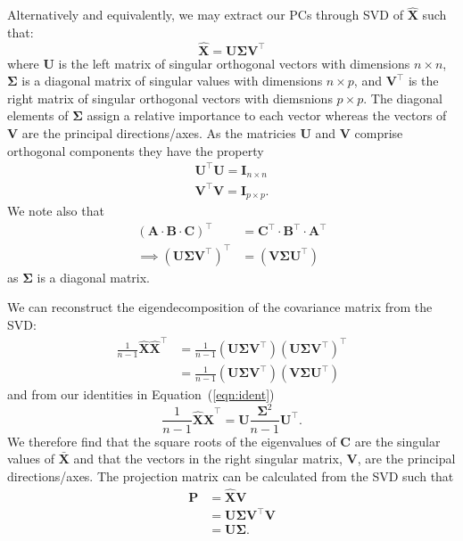 Alternatively and equivalently, we may extract our PCs through SVD of  $\mathbf{\hat{X}}$ such that: 
\begin{equation}
    \mathbf{\hat{X}} = \mathbf{U}  \mathbf{\Sigma} \mathbf{ V^\top}
\end{equation}
where \textbf{U} is the left matrix of singular orthogonal vectors with dimensions ${n \times n}$,
$\mathbf{\Sigma}$ is a diagonal matrix of singular values with dimensions $n \times p$, 
and $\mathbf{V^{\top}}$ is the right matrix of singular  orthogonal vectors with diemsnions ${p \times p}$. 
The diagonal elements of $\mathbf{\Sigma}$ assign a  relative  importance  to  each  vector whereas the vectors of \textbf{V} are the principal directions/axes.
As the matricies \textbf{U} and \textbf{V} comprise orthogonal components they have the property
\begin{eqnarray}
\label{eqn:ident}
\mathbf{U^{\top}U}=\mathbf I_{n \times n} \\ \nonumber
\mathbf{V^{\top}V}=\mathbf I_{p \times p}.
\end{eqnarray}
We note also that 
\begin{align}
    \left(\mathbf {A \cdot B \cdot C }\right)^\top &= \mathbf{C^\top \cdot B^\top \cdot A^\top} \\
    \implies  (\mathbf U\mathbf \Sigma\mathbf V^\top)^\top &= (\mathbf V\mathbf \Sigma\mathbf U^\top)
\end{align}
as $\mathbf{\Sigma}$ is a diagonal matrix.


We can reconstruct the eigendecomposition of the covariance matrix from the SVD: 
\begin{eqnarray}
 \frac{1}{n-1}\mathbf{\hat{X}}\mathbf{\hat{X}}^\top &= \frac{1}{n-1} (\mathbf U\mathbf \Sigma\mathbf V^\top)(\mathbf U\mathbf \Sigma\mathbf V^\top)^\top\\[3pt] \nonumber
&= \frac{1}{n-1}(\mathbf U\mathbf \Sigma\mathbf V^\top)(\mathbf V\mathbf \Sigma\mathbf U^\top)
\end{eqnarray}
and from our identities in Equation~(\ref{eqn:ident})
\begin{equation}
 \frac{1}{n-1}\mathbf{\hat{X}}\mathbf{\hat{X}}^\top=\mathbf U \frac{\mathbf \Sigma^2}{n-1} \mathbf U^\top.
\end{equation}
We therefore find that the square roots of the eigenvalues of $\mathbf{C}$ are the singular values of  $\mathbf{\bar{X}}$ and that the vectors in the right singular matrix, \textbf{V}, are the principal directions/axes. The projection matrix can be calculated from the SVD such that 
\begin{align}
\mathbf{P} &= \mathbf{\hat{X}}  \mathbf{V} \\[3pt] \nonumber
           &= \mathbf U \mathbf \Sigma \mathbf V^\top \mathbf{V}  \\[3pt] \nonumber
           &= \mathbf U \mathbf \Sigma.
\end{align}

